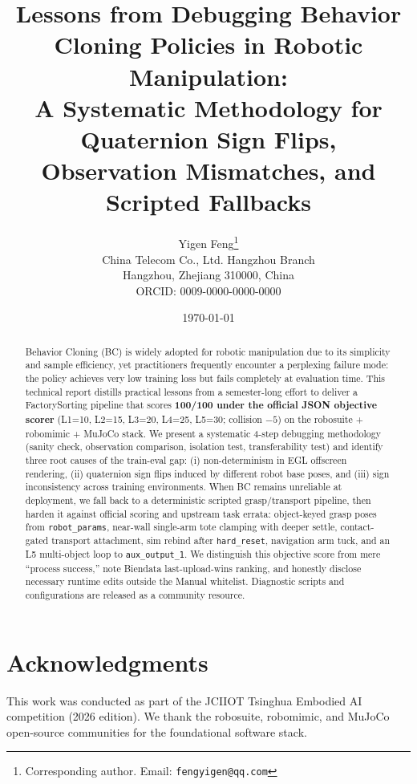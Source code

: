 \documentclass[11pt,a4paper]{article}
\title{Lessons from Debugging Behavior Cloning Policies in Robotic Manipulation: \\
       A Systematic Methodology for Quaternion Sign Flips, \\
       Observation Mismatches, and Scripted Fallbacks}
\author{
  Yigen Feng\thanks{Corresponding author. Email: \texttt{fengyigen@qq.com}} \\
  China Telecom Co., Ltd. Hangzhou Branch \\
  Hangzhou, Zhejiang 310000, China \\
  ORCID: 0009-0000-0000-0000
}
\date{\today}
\newcommand{\code}[1]{\texttt{#1}}
\begin{document}
\maketitle

\begin{abstract}
Behavior Cloning (BC) is widely adopted for robotic manipulation due to its simplicity and sample efficiency, yet practitioners frequently encounter a perplexing failure mode: the policy achieves very low training loss but fails completely at evaluation time. This technical report distills practical lessons from a semester-long effort to deliver a FactorySorting pipeline that scores \textbf{100/100 under the official JSON objective scorer} (L1{=}10, L2{=}15, L3{=}20, L4{=}25, L5{=}30; collision $-5$) on the robosuite + robomimic + MuJoCo stack. We present a systematic 4-step debugging methodology (sanity check, observation comparison, isolation test, transferability test) and identify three root causes of the train-eval gap: (i) non-determinism in EGL offscreen rendering, (ii) quaternion sign flips induced by different robot base poses, and (iii) sign inconsistency across training environments. When BC remains unreliable at deployment, we fall back to a deterministic scripted grasp/transport pipeline, then harden it against official scoring and upstream task errata: object-keyed grasp poses from \code{robot\_params}, near-wall single-arm tote clamping with deeper settle, contact-gated transport attachment, sim rebind after \code{hard\_reset}, navigation arm tuck, and an L5 multi-object loop to \code{aux\_output\_1}. We distinguish this objective score from mere ``process success,'' note Biendata last-upload-wins ranking, and honestly disclose necessary runtime edits outside the Manual whitelist. Diagnostic scripts and configurations are released as a community resource.
\end{abstract}










\section*{Acknowledgments}
This work was conducted as part of the JCIIOT Tsinghua Embodied AI competition (2026 edition). We thank the robosuite, robomimic, and MuJoCo open-source communities for the foundational software stack.





\end{document}
